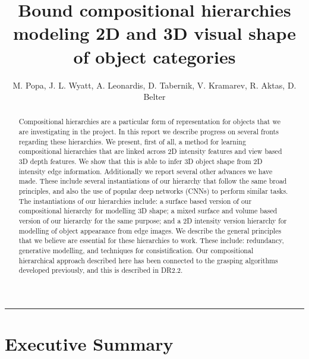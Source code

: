 \documentclass[a4paper,11pt,pdf]{../templates/pacmanreport}
\title{Bound compositional hierarchies modeling 2D and 3D visual shape of object categories}
\author{M. Popa, J. L. Wyatt, A. Leonardis, D. Tabernik, V. Kramarev, R. Aktas, D. Belter}
\begin{document}
\maketitle

\begin{abstract}
\noindent Compositional hierarchies are a particular form of representation for objects that we are investigating in the project. In this report we describe progress on several fronts regarding these hierarchies. We present, first of all, a method for learning compositional hierarchies that are linked across 2D intensity features and view based 3D depth features. We show that this is able to infer 3D object shape from 2D intensity edge information. Additionally we report several other advances we have made. These include several instantiations of our hierarchy that follow the same broad principles, and also the use of popular deep networks (CNNs) to perform similar tasks. The instantiations of our hierarchies include: a surface based version of our compositional hierarchy for modelling 3D shape; a mixed surface and volume based version of our hierarchy for the same purpose; and a 2D intensity version hierarchy for modelling of object appearance from edge images. We describe the general principles that we believe are essential for these hierarchies to work. These include: redundancy, generative modelling, and techniques for consistification. Our compositional hierarchical approach described here has been connected to the grasping algorithms developed previously, and this is described in DR2.2.
\end{abstract}


\vspace{.2em}
\hrule

\footnotesize

\tableofcontents

\normalsize

\newpage

\section*{Executive Summary}

\end{document}
